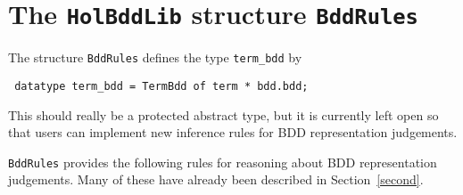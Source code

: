 \documentclass[12pt]{article}
\renewcommand{\t}[1]{\mbox{\tt #1}}
\newcommand{\ty}[1]{\mbox{\tt #1}}
\newcommand{\ml}[1]{{\tt #1}}
\newcommand\termbddty{\ty{term\_bdd}}
\begin{document}
\section{The \t{HolBddLib} structure \t{BddRules}}\label{BddRules}

The structure \ml{BddRules} defines the type \termbddty{} by

\begin{verbatim}
 datatype term_bdd = TermBdd of term * bdd.bdd;
\end{verbatim}

This should really be a protected abstract type, but it is currently
left open so that users can implement new inference rules for BDD
representation judgements.

\ml{BddRules} provides the following rules for reasoning
about BDD representation judgements. Many of these have already been described in
Section~\ref{second}.
\end{document}
